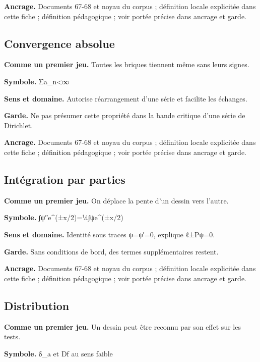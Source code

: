 \documentclass[
  9pt,
  a4paper,
]{article}
\begin{document}
\textbf{Ancrage.} Documents 67-68 et noyau du corpus ; définition locale
explicitée dans cette fiche ; définition pédagogique ; voir portée
précise dans ancrage et garde.

\hypertarget{convergence-absolue}{%
\subsection{Convergence absolue}\label{convergence-absolue}}

\textbf{Comme un premier jeu.} Toutes les briques tiennent même sans
leurs signes.

\textbf{Symbole.} Σ\textbar a\_n\textbar\textless∞

\textbf{Sens et domaine.} Autorise réarrangement d'une série et facilite
les échanges.

\textbf{Garde.} Ne pas présumer cette propriété dans la bande critique
d'une série de Dirichlet.

\textbf{Ancrage.} Documents 67-68 et noyau du corpus ; définition locale
explicitée dans cette fiche ; définition pédagogique ; voir portée
précise dans ancrage et garde.

\hypertarget{intuxe9gration-par-parties}{%
\subsection{Intégration par parties}\label{intuxe9gration-par-parties}}

\textbf{Comme un premier jeu.} On déplace la pente d'un dessin vers
l'autre.

\textbf{Symbole.} ∫ψ″e\^{}(±x/2)=¼∫ψe\^{}(±x/2)

\textbf{Sens et domaine.} Identité sous traces ψ=ψ′=0, explique ℓ±Pψ=0.

\textbf{Garde.} Sans conditions de bord, des termes supplémentaires
restent.

\textbf{Ancrage.} Documents 67-68 et noyau du corpus ; définition locale
explicitée dans cette fiche ; définition pédagogique ; voir portée
précise dans ancrage et garde.

\hypertarget{distribution}{%
\subsection{Distribution}\label{distribution}}

\textbf{Comme un premier jeu.} Un dessin peut être reconnu par son effet
sur les tests.

\textbf{Symbole.} δ\_a et Df au sens faible
\end{document}
